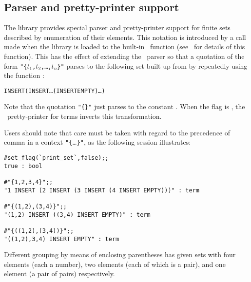 \subsection{Parser and pretty-printer support}\label{finite}

The  library provides special parser and pretty-printer
support for finite sets described by enumeration of their elements.  This
notation is introduced by a call made when the library is loaded to the
built-in \ML\ function %
(see~\cite{description} for details of this function).  This has the effect of
extending the \HOL\ parser so that a quotation of the form
{\small\verb!"{!\tt$t_1$,$t_2$,\dots,$t_n$\verb!}"!} parses to the following
set built up from  by repeatedly using the function :

\begin{hol}\begin{alltt}
   INSERT  (INSERT  \dots (INSERT  EMPTY)\dots)
\end{alltt}\end{hol}

\noindent Note that the quotation {\small\verb!"{}"!} just parses to the
constant . When the
flag is , the \HOL\ pretty-printer for terms inverts this
transformation.

Users should note that care must be taken with regard to the precedence of
comma in a context {\small\verb!"{!\dots\verb!}"!}, as the following session
illustrates:

\setcounter{sessioncount}{1}
\begin{session}\begin{verbatim}
#set_flag(`print_set`,false);;
true : bool

#"{1,2,3,4}";;
"1 INSERT (2 INSERT (3 INSERT (4 INSERT EMPTY)))" : term

#"{(1,2),(3,4)}";;
"(1,2) INSERT ((3,4) INSERT EMPTY)" : term

#"{((1,2),(3,4))}";;
"((1,2),3,4) INSERT EMPTY" : term
\end{verbatim}\end{session}

\noindent Different grouping by means of enclosing parentheses has given sets
with four elements (each a number), two elements (each of which is a pair), and
one element (a pair of pairs) respectively.

